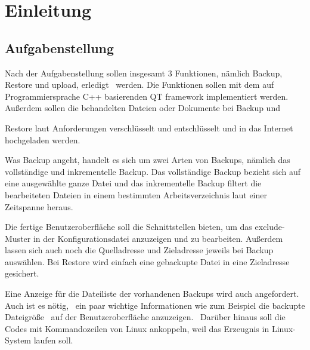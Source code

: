 \chapter{Einleitung }

\section{Aufgabenstellung}

Nach der Aufgabenstellung sollen insgesamt 3 Funktionen, nämlich Backup, Restore und upload, erledigt  werden. Die Funktionen sollen mit dem auf Programmiersprache C++ basierenden QT framework implementiert werden. Außerdem sollen die behandelten Dateien oder Dokumente bei Backup und \par Restore laut Anforderungen verschlüsselt und entschlüsselt und in das Internet hochgeladen werden. 
\par Was Backup angeht, handelt es sich um zwei Arten von Backups, nämlich das vollständige und inkrementelle Backup. Das vollständige Backup bezieht sich auf eine ausgewählte ganze Datei und das inkrementelle Backup filtert die bearbeiteten Dateien in einem bestimmten Arbeitsverzeichnis laut einer Zeitspanne heraus. 
\par Die fertige Benutzeroberfläche soll die Schnittstellen bieten, um das exclude-Muster in der Konfigurationsdatei anzuzeigen und zu bearbeiten. Außerdem lassen sich auch noch die Quelladresse und Zieladresse jeweils bei Backup auswählen. Bei Restore wird einfach eine gebackupte Datei in eine Zieladresse gesichert. 
\par Eine Anzeige für die Dateiliste der vorhandenen Backups wird auch angefordert. Auch ist es nötig,  ein paar wichtige Informationen wie zum Beispiel die backupte Dateigröße  auf der Benutzeroberfläche anzuzeigen. 
Darüber hinaus soll die Codes mit Kommandozeilen von Linux ankoppeln, weil das Erzeugnis in Linux-System laufen soll.

